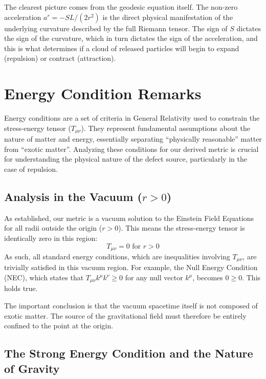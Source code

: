 \documentclass[%
  reprint,
  superscriptaddress,
  showpacs,
  showkeys,
  amsmath,amssymb,
  pra,
  longbibliography,
  floatfix,
  x11names
]{revtex4-2}
\begin{document}
The clearest picture comes from the geodesic equation itself. The non-zero acceleration $a^r = -SL/(2r^2)$ is the direct physical manifestation of the underlying curvature described by the full Riemann tensor. The sign of $S$ dictates the sign of the curvature, which in turn dictates the sign of the acceleration, and this is what determines if a cloud of released particles will begin to expand (repulsion) or contract (attraction).

\section{Energy Condition Remarks}
\label{sec:energy}

Energy conditions are a set of criteria in General Relativity used to constrain the stress-energy tensor ($T_{\mu\nu}$). They represent fundamental assumptions about the nature of matter and energy, essentially separating ``physically reasonable'' matter from ``exotic matter''. Analyzing these conditions for our derived metric is crucial for understanding the physical nature of the defect source, particularly in the case of repulsion.

\subsection{Analysis in the Vacuum ($r > 0$)}

As established, our metric is a vacuum solution to the Einstein Field Equations for all radii outside the origin ($r>0$). This means the stress-energy tensor is identically zero in this region:
\begin{equation}
    T_{\mu\nu} = 0 \text{ for } r > 0
\end{equation}
As such, all standard energy conditions, which are inequalities involving $T_{\mu\nu}$, are trivially satisfied in this vacuum region. For example, the Null Energy Condition (NEC), which states that $T_{\mu\nu}k^\mu k^\nu \ge 0$ for any null vector $k^\mu$, becomes $0 \ge 0$. This holds true.

The important conclusion is that the vacuum spacetime itself is not composed of exotic matter. The source of the gravitational field must therefore be entirely confined to the point at the origin.

\subsection{The Strong Energy Condition and the Nature of Gravity}
\end{document}
